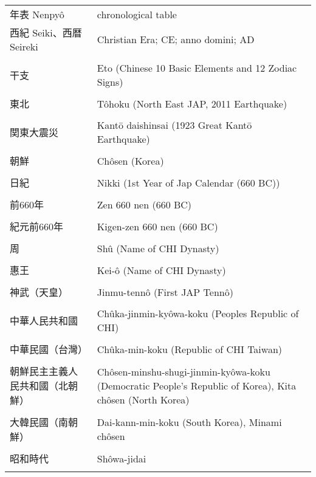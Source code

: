 \documentclass{article}
\begin{document}
\begin{tabular}{ l | p{10.5cm} }
年表 Nenpyô		&chronological table \\[-1em]
西紀 Seiki、西暦 Seireki		&Christian Era; CE; anno domini; AD \\ \hline \\[-1em] %
干支 						&Eto (Chinese 10 Basic Elements and 12 Zodiac Signs)\\ \hline \\[-1em]
東北 						&Tôhoku (North East JAP, 2011 Earthquake)\\ \hline \\[-1em]
関東大震災  &Kantō daishinsai (1923 Great Kantō Earthquake) \\ \hline \\[-1em]
朝鮮 						&Chôsen	 (Korea)\\ \hline \\[-1em]
日紀 						&Nikki (1st Year of Jap Calendar (660 BC))\\ \hline \\[-1em]
前660年 						&Zen 660 nen (660 BC)\\ \hline \\[-1em]
紀元前660年 					&Kigen-zen 660 nen (660 BC)\\ \hline \\[-1em]
周  							&Shû (Name of CHI Dynasty)\\ \hline \\[-1em]            %
惠王 						&Kei-ô (Name of CHI Dynasty)\\ \hline \\[-1em]          %
神武（天皇）					&Jinmu-tennô  (First JAP Tennô)\\ \hline \\[-1em]
中華人民共和國 				&Chûka-jinmin-kyôwa-koku	(Peoples Republic of CHI) \\ \hline \\[-1em]
中華民國（台灣）					&Chûka-min-koku (Republic of CHI {Taiwan})\\ \hline \\[-1em]
朝鮮民主主義人民共和國（北朝鮮） 	&Chôsen-minshu-shugi-jinmin-kyôwa-koku (Democratic People's Republic of Korea), Kita chôsen (North Korea)\\ \hline \\[-1em]
大韓民國（南朝鮮） 				& Dai-kann-min-koku (South Korea), Minami chôsen	\\ \hline \\[-1em]
昭和時代 						&Shôwa-jidai \\ \hline \\[-1em]

\end{tabular}
\end{document}
